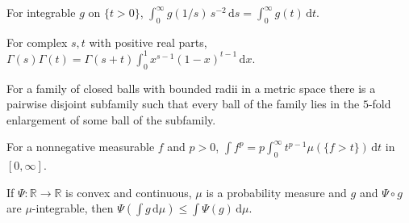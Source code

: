 \begin{theorem}\label{thm:std_inversion}
\mathlibok
For integrable $g$ on $\{t > 0\}$, $\int_0^\infty g(1/s)\, s^{-2}\, \mathrm{d}s = \int_0^\infty g(t)\, \mathrm{d}t$.
\end{theorem}

\begin{theorem}\label{thm:std_beta_gamma}
\mathlibok
For complex $s, t$ with positive real parts, $\Gamma(s)\Gamma(t) = \Gamma(s+t) \int_0^1 x^{s-1} (1-x)^{t-1}\, \mathrm{d}x$.
\end{theorem}

\begin{theorem}\label{thm:std_vitali}
\mathlibok
For a family of closed balls with bounded radii in a metric space there is a pairwise disjoint subfamily such that every ball of the family lies in the $5$-fold enlargement of some ball of the subfamily.
\end{theorem}

\begin{theorem}\label{thm:std_layer_cake}
\mathlibok
For a nonnegative measurable $f$ and $p > 0$, $\int f^p = p \int_0^\infty t^{p-1} \mu(\{f > t\})\, \mathrm{d}t$ in $[0, \infty]$.
\end{theorem}

\begin{theorem}\label{thm:std_jensen}
\mathlibok
If $\Psi \colon \mathbb{R} \to \mathbb{R}$ is convex and continuous, $\mu$ is a probability measure and $g$ and $\Psi \circ g$ are $\mu$-integrable, then $\Psi(\int g\, \mathrm{d}\mu) \le \int \Psi(g)\, \mathrm{d}\mu$.
\end{theorem}
